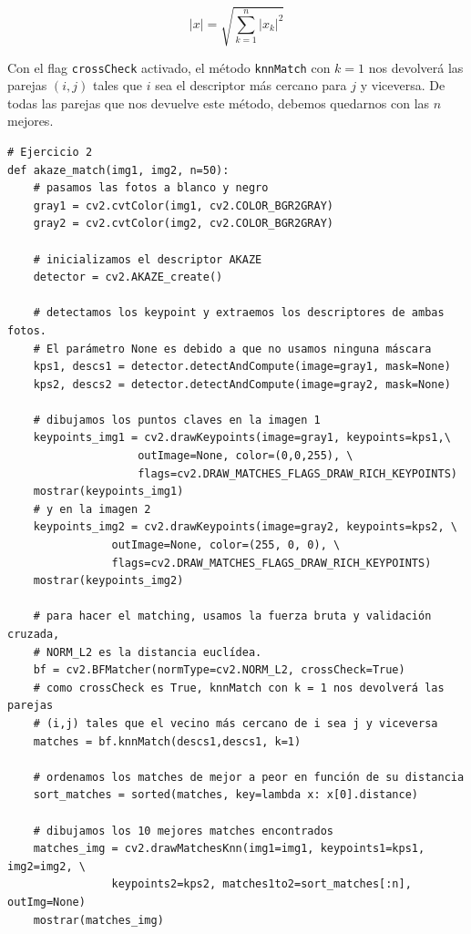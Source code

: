 \documentclass[11pt,a4paper]{article}
\theoremstyle{plain}
\theoremstyle{definition}
\begin{document}
\begin{displaymath}
 |x| = \sqrt{\sum_{k=1}^n |x_k|^2} 
\end{displaymath}

Con el flag \texttt{crossCheck} activado, el método \texttt{knnMatch} con $k=1$ nos devolverá las parejas $(i,j)$ tales que $i$ sea el descriptor más cercano para $j$ y viceversa. De todas las parejas que nos devuelve este método, debemos quedarnos con las $n$ mejores.

\begin{verbatim}
# Ejercicio 2
def akaze_match(img1, img2, n=50):
    # pasamos las fotos a blanco y negro
    gray1 = cv2.cvtColor(img1, cv2.COLOR_BGR2GRAY)
    gray2 = cv2.cvtColor(img2, cv2.COLOR_BGR2GRAY)

    # inicializamos el descriptor AKAZE
    detector = cv2.AKAZE_create()

    # detectamos los keypoint y extraemos los descriptores de ambas fotos. 
    # El parámetro None es debido a que no usamos ninguna máscara
    kps1, descs1 = detector.detectAndCompute(image=gray1, mask=None)
    kps2, descs2 = detector.detectAndCompute(image=gray2, mask=None)

    # dibujamos los puntos claves en la imagen 1
    keypoints_img1 = cv2.drawKeypoints(image=gray1, keypoints=kps1,\
                    outImage=None, color=(0,0,255), \
                    flags=cv2.DRAW_MATCHES_FLAGS_DRAW_RICH_KEYPOINTS)
    mostrar(keypoints_img1)
    # y en la imagen 2
    keypoints_img2 = cv2.drawKeypoints(image=gray2, keypoints=kps2, \
                outImage=None, color=(255, 0, 0), \
                flags=cv2.DRAW_MATCHES_FLAGS_DRAW_RICH_KEYPOINTS)
    mostrar(keypoints_img2)

    # para hacer el matching, usamos la fuerza bruta y validación cruzada, 
    # NORM_L2 es la distancia euclídea.
    bf = cv2.BFMatcher(normType=cv2.NORM_L2, crossCheck=True)
    # como crossCheck es True, knnMatch con k = 1 nos devolverá las parejas 
    # (i,j) tales que el vecino más cercano de i sea j y viceversa
    matches = bf.knnMatch(descs1,descs1, k=1)

    # ordenamos los matches de mejor a peor en función de su distancia
    sort_matches = sorted(matches, key=lambda x: x[0].distance)

    # dibujamos los 10 mejores matches encontrados
    matches_img = cv2.drawMatchesKnn(img1=img1, keypoints1=kps1, img2=img2, \
                keypoints2=kps2, matches1to2=sort_matches[:n], outImg=None)
    mostrar(matches_img)
\end{verbatim}
\end{document}
